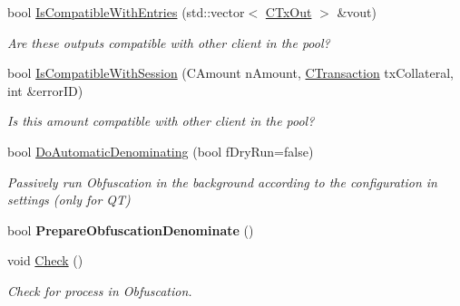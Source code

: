 \begin{DoxyCompactItemize}
\mbox{\label{class_c_obfuscation_pool_a84a807c95de8ed1960ea8d58862d0312}} 
bool \mbox{\hyperlink{class_c_obfuscation_pool_a84a807c95de8ed1960ea8d58862d0312}{Is\+Compatible\+With\+Entries}} (std\+::vector$<$ \mbox{\hyperlink{class_c_tx_out}{C\+Tx\+Out}} $>$ \&vout)
\begin{DoxyCompactList}\small\item\em Are these outputs compatible with other client in the pool? \end{DoxyCompactList}\item 
\mbox{\label{class_c_obfuscation_pool_a820877f910e3f13086f3996acff68677}} 
bool \mbox{\hyperlink{class_c_obfuscation_pool_a820877f910e3f13086f3996acff68677}{Is\+Compatible\+With\+Session}} (C\+Amount n\+Amount, \mbox{\hyperlink{class_c_transaction}{C\+Transaction}} tx\+Collateral, int \&error\+ID)
\begin{DoxyCompactList}\small\item\em Is this amount compatible with other client in the pool? \end{DoxyCompactList}\item 
\mbox{\label{class_c_obfuscation_pool_a5b8c42ae53f4f04ab4a93da2aab47a4b}} 
bool \mbox{\hyperlink{class_c_obfuscation_pool_a5b8c42ae53f4f04ab4a93da2aab47a4b}{Do\+Automatic\+Denominating}} (bool f\+Dry\+Run=false)
\begin{DoxyCompactList}\small\item\em Passively run Obfuscation in the background according to the configuration in settings (only for QT) \end{DoxyCompactList}\item 
\mbox{\label{class_c_obfuscation_pool_a136c9f54ae6e785e24a0f365cb889a77}} 
bool {\bfseries Prepare\+Obfuscation\+Denominate} ()
\item 
\mbox{\label{class_c_obfuscation_pool_a28bedf6211bbda7456b68aa3e4d2a3e2}} 
void \mbox{\hyperlink{class_c_obfuscation_pool_a28bedf6211bbda7456b68aa3e4d2a3e2}{Check}} ()
\begin{DoxyCompactList}\small\item\em Check for process in Obfuscation. \end{DoxyCompactList}\item 

\end{DoxyCompactItemize}
